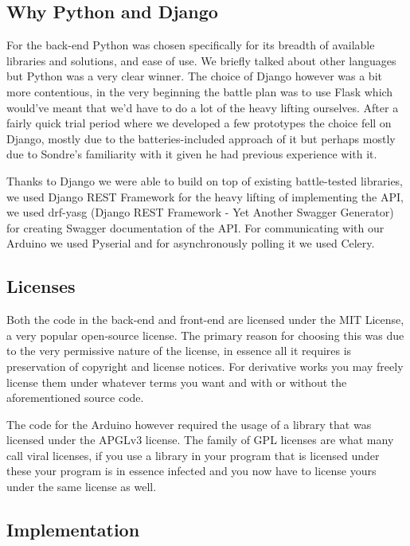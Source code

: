 \documentclass[12pt,a4paper,oneside,article]{memoir}
\numberwithin{equation}{chapter}
\begin{document}
\subsection{Why Python and Django}\label{sec:why-python-django}
For the back-end Python was chosen specifically for its breadth of available
libraries and solutions, and ease of use. We briefly talked about other
languages but Python was a very clear winner. The choice of Django however was a
bit more contentious, in the very beginning the battle plan was to use Flask
which would've meant that we'd have to do a lot of the heavy lifting ourselves.
After a fairly quick trial period where we developed a few prototypes the choice
fell on Django, mostly due to the batteries-included approach of it but perhaps
mostly due to Sondre's familiarity with it given he had previous experience with
it.

Thanks to Django we were able to build on top of existing battle-tested
libraries, we used Django REST Framework for the heavy lifting of implementing
the API, we used drf-yasg (Django REST Framework - Yet Another Swagger
Generator) for creating Swagger documentation of the API. For communicating with
our Arduino we used Pyserial and for asynchronously polling it we used Celery.

\subsection{Licenses}\label{sec:licenses}
Both the code in the back-end and front-end are licensed under the MIT License,
a very popular open-source license. The primary reason for choosing this was due
to the very permissive nature of the license, in essence all it requires is
preservation of copyright and license notices. For derivative works you may
freely license them under whatever terms you want and with or without the
aforementioned source code.

The code for the Arduino however required the usage of a library that was
licensed under the APGLv3 license. The family of GPL licenses are what many call
viral licenses, if you use a library in your program that is licensed under
these your program is in essence infected and you now have to license yours
under the same license as well.

\subsection{Implementation}\label{sec:implementation}
\end{document}
